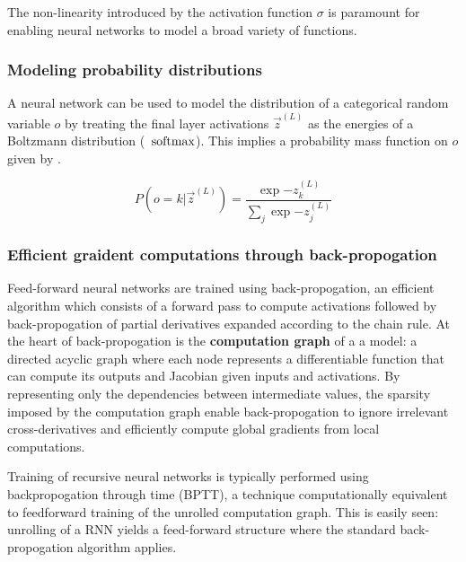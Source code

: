 The non-linearity introduced by the activation function $\sigma$ is paramount
for enabling neural networks to model a broad variety of functions. 

\subsubsection{Modeling probability distributions}

A neural network can be used to model the distribution of a categorical random
variable $o$ by treating the final layer activations $\vec{z}^{(L)}$ as the
energies of a Boltzmann distribution (\ie\ $\operatorname*{softmax}$). This implies a
probability mass function on $o$ given by .

\begin{equation}
    \label{eq:softmax}
    P(o = k | \vec{z}^{(L)}) = \frac{\exp{-z^{(L)}_k}}{ \sum_{j} \exp{-z^{(L)}_j} }
\end{equation}

\subsubsection{Efficient graident computations through back-propogation}

Feed-forward neural networks are trained using back-propogation, an efficient
algorithm which consists of a forward pass to compute activations followed by
back-propogation of partial derivatives expanded according to the chain
rule. At the heart of back-propogation is the
\textbf{computation graph} of a a model: a directed acyclic graph where each
node represents a differentiable function that can compute its outputs and
Jacobian given inputs and activations. By representing only
the dependencies between intermediate values, the sparsity imposed by the
computation graph enable back-propogation to ignore irrelevant
cross-derivatives and efficiently compute global gradients from local
computations.


Training of recursive neural networks is typically performed using
backpropogation through time (BPTT), a technique computationally
equivalent to feedforward training of the unrolled computation graph. This is
easily seen: unrolling of a RNN yields a feed-forward structure where the
standard back-propogation algorithm applies.




